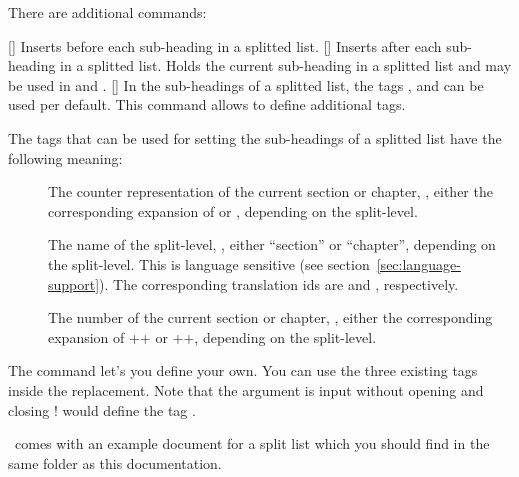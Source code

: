 \documentclass[load-preamble+]{cnltx-doc}
\begin{document}
There are additional commands:
\begin{commands}
  []
    Inserts  before each sub-heading in a
    splitted list.
  []
    Inserts  after each sub-heading in a splitted
    list.
    Holds the current sub-heading in a splitted list and may
    be used in  and .
  []
    In the sub-headings of a splitted list, the tags
    ,  and  can be used per
    default.  This command allows to define additional tags.
\end{commands}

The tags that can be used for setting the sub-headings of a splitted list have
the following meaning:
\begin{description}
  \item[] The counter representation of the current section or
    chapter, \ie, either the corresponding expansion of  or
    , depending on the split-level.
  \item[] The name of the split-level, \ie, either ``section'' or
    ``chapter'', depending on the split-level.  This is language sensitive
    (see section~\ref{sec:language-support}).  The corresponding translation
    ids are  and , respectively.
  \item[] The number of the current section or chapter,
    \ie, either the corresponding expansion of \verbcode++ or
    \verbcode++, depending on the split-level.
\end{description}
The command  let's you define your own. You can use the
three existing tags inside the replacement.  Note that the  argument
is input without opening \code{<} and closing \code{>}!
 would define the tag .

\enotez\ comes with an example document for a split list which you should find
in the same folder as this documentation.
\end{document}
